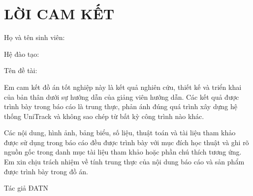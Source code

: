 \chapter*{LỜI CAM KẾT}

\noindent Họ và tên sinh viên: \StudentName

\noindent Hệ đào tạo: \TrainingProgram

\vspace{0.5cm}

\noindent Tên đề tài: \ReportTitle

Em cam kết đồ án tốt nghiệp này là kết quả nghiên cứu, thiết kế và triển khai của bản thân dưới sự hướng dẫn của giảng viên hướng dẫn. Các kết quả được trình bày trong báo cáo là trung thực, phản ánh đúng quá trình xây dựng hệ thống UniTrack và không sao chép từ bất kỳ công trình nào khác.

Các nội dung, hình ảnh, bảng biểu, số liệu, thuật toán và tài liệu tham khảo được sử dụng trong báo cáo đều được trình bày với mục đích học thuật và ghi rõ nguồn gốc trong danh mục tài liệu tham khảo hoặc phần chú thích tương ứng. Em xin chịu trách nhiệm về tính trung thực của nội dung báo cáo và sản phẩm được trình bày trong đồ án.

\vspace{1cm}
\begin{flushright}
\CommitmentDate

Tác giả ĐATN

\vspace{2cm}
\textit{\StudentName}
\end{flushright}
